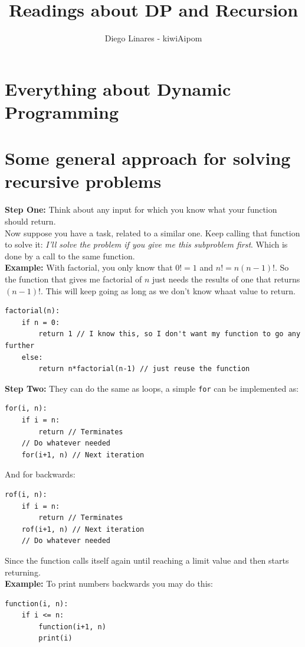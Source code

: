 \documentclass{IEEEtran}
\title{Readings about DP and Recursion}
\author{Diego Linares - kiwiAipom}
\begin{document}
    \maketitle

    \section{Everything about Dynamic Programming}

    \section{Some general approach for solving recursive problems}
        \textbf{Step One:} Think about any input for which you know what your function should return.\\
        Now suppose you have a task, related to a similar one. Keep calling that function to solve it: \textit{I'll solve the problem if you give me this subproblem first}. Which is done by a call to the same function.\\
        \textbf{Example:} With factorial, you only know that $0!=1$ and $n!=n(n-1)!$. So the function that gives me factorial of $n$ just needs the results of one that returns $(n-1)!$. This will keep going as long as we don't know whaat value to return.
        \begin{lstlisting}
factorial(n):
    if n = 0:
        return 1 // I know this, so I don't want my function to go any further
    else:
        return n*factorial(n-1) // just reuse the function
        \end{lstlisting}
        \textbf{Step Two:} They can do the same as loops, a simple \texttt{for} can be implemented as:
        \begin{lstlisting}
for(i, n):
    if i = n:
        return // Terminates
    // Do whatever needed
    for(i+1, n) // Next iteration
        \end{lstlisting}
        And for backwards:
        \begin{lstlisting}
rof(i, n):
    if i = n:
        return // Terminates
    rof(i+1, n) // Next iteration    
    // Do whatever needed
        \end{lstlisting}
        Since the function calls itself again until reaching a limit value and then starts returning.\\
        \textbf{Example:} To print numbers backwards you may do this:
        \begin{lstlisting}
function(i, n):
    if i <= n:
        function(i+1, n)
        print(i)
        \end{lstlisting}
\end{document}
